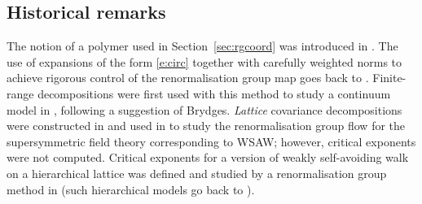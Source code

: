 
\subsection{Historical remarks}

The notion of a polymer used in Section~\ref{sec:rgcoord} was introduced in
\cite{GK71}. The use of expansions of the form \eqref{e:circ} together with
carefully weighted norms to achieve rigorous control of the renormalisation
group map goes back to \cite{BY90}.
Finite-range decompositions were first used with this method to study a
continuum model in
\cite{MS00}, following a suggestion of Brydges. \emph{Lattice} covariance
decompositions were constructed in \cite{BGM04} and used in
\cite{MS08} to study the renormalisation group flow for the supersymmetric
field theory corresponding to WSAW; however, critical exponents were not
computed.
Critical exponents for a version of weakly self-avoiding walk on a hierarchical
lattice was defined and studied by a renormalisation group method in
\cite{BEI92,BI03c,BI03d} (such hierarchical models go back to \cite{Dyso69}).

